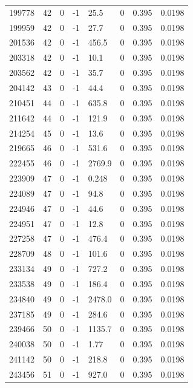 \documentclass[preview]{standalone}
\begin{document}
{{{{{\begin{tabular}{L{1.2cm}C{1.2cm} C{0.3cm}C{0.5cm} C{1.4cm}C{1.4cm} C{1.4cm}C{1.4cm}}
  199778  &    42  & 0     & -1 &  25.5  & 0  & 0.395 &  0.0198   \\ 
  199959  &    42  & 0     & -1 &  27.7  & 0  & 0.395 &  0.0198   \\ 
  201536  &    42  & 0     & -1 &  456.5  & 0  & 0.395 &  0.0198   \\ 
  203318  &    42  & 0     & -1 &  10.1  & 0  & 0.395 &  0.0198   \\ 
  203562  &    42  & 0     & -1 &  35.7  & 0  & 0.395 &  0.0198   \\ 
  204142  &    43  & 0     & -1 &  44.4  & 0  & 0.395 &  0.0198   \\ 
  210451  &    44  & 0     & -1 &  635.8  & 0  & 0.395 &  0.0198   \\ 
  211642  &    44  & 0     & -1 &  121.9  & 0  & 0.395 &  0.0198   \\ 
  214254  &    45  & 0     & -1 &  13.6  & 0  & 0.395 &  0.0198   \\ 
  219665  &    46  & 0     & -1 &  531.6  & 0  & 0.395 &  0.0198   \\ 
  222455  &    46  & 0     & -1 &  2769.9  & 0  & 0.395 &  0.0198   \\ 
  223909  &    47  & 0     & -1 &  0.248  & 0  & 0.395 &  0.0198   \\ 
  224089  &    47  & 0     & -1 &  94.8  & 0  & 0.395 &  0.0198   \\ 
  224946  &    47  & 0     & -1 &  44.6  & 0  & 0.395 &  0.0198   \\ 
  224951  &    47  & 0     & -1 &  12.8  & 0  & 0.395 &  0.0198   \\ 
  227258  &    47  & 0     & -1 &  476.4  & 0  & 0.395 &  0.0198   \\ 
  228709  &    48  & 0     & -1 &  101.6  & 0  & 0.395 &  0.0198   \\ 
  233134  &    49  & 0     & -1 &  727.2  & 0  & 0.395 &  0.0198   \\ 
  233538  &    49  & 0     & -1 &  186.4  & 0  & 0.395 &  0.0198   \\ 
  234840  &    49  & 0     & -1 &  2478.0  & 0  & 0.395 &  0.0198   \\ 
  237185  &    49  & 0     & -1 &  284.6  & 0  & 0.395 &  0.0198   \\ 
  239466  &    50  & 0     & -1 &  1135.7  & 0  & 0.395 &  0.0198   \\ 
  240038  &    50  & 0     & -1 &  1.77  & 0  & 0.395 &  0.0198   \\ 
  241142  &    50  & 0     & -1 &  218.8  & 0  & 0.395 &  0.0198   \\ 
  243456  &    51  & 0     & -1 &  927.0  & 0  & 0.395 &  0.0198   \\ 
\hline 
\end{tabular} 

}}}}}
\end{document}
